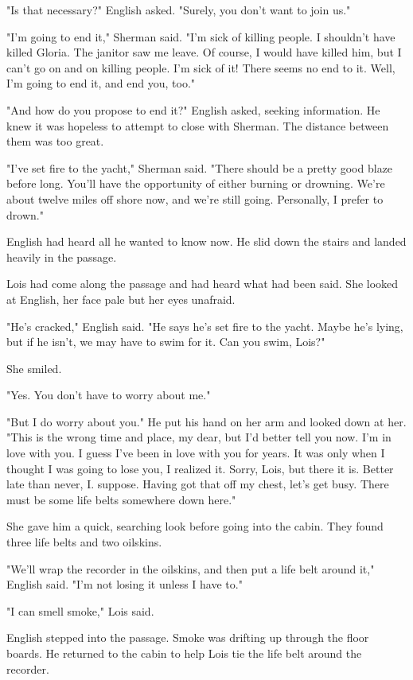 \documentclass{novel}
\begin{document}
"Is that necessary?" English asked. "Surely, you don't want to join us."

"I'm going to end it," Sherman said. "I'm sick of killing people. I shouldn't have killed Gloria. The janitor saw me leave. Of course, I would have killed him, but I can't go on and on killing people. I'm sick of it! There seems no end to it. Well, I'm going to end it, and end you, too."

"And how do you propose to end it?" English asked, seeking information. He knew it was hopeless to attempt to close with Sherman. The distance between them was too great.

"I've set fire to the yacht," Sherman said. "There should be a pretty good blaze before long. You'll have the opportunity of either burning or drowning. We're about twelve miles off shore now, and we're still going. Personally, I prefer to drown."

English had heard all he wanted to know now. He slid down the stairs and landed heavily in the passage.

Lois had come along the passage and had heard what had been said. She looked at English, her face pale but her eyes unafraid.

"He's cracked," English said. "He says he's set fire to the yacht. Maybe he's lying, but if he isn't, we may have to swim for it. Can you swim, Lois?"

She smiled.

"Yes. You don't have to worry about me."

"But I do worry about you." He put his hand on her arm and looked down at her. "This is the wrong time and place, my dear, but I'd better tell you now. I'm in love with you. I guess I've been in love with you for years. It was only when I thought I was going to lose you, I realized it. Sorry, Lois, but there it is. Better late than never, I. suppose. Having got that off my chest, let's get busy. There must be some life belts somewhere down here."

She gave him a quick, searching look before going into the cabin. They found three life belts and two oilskins.

"We'll wrap the recorder in the oilskins, and then put a life belt around it," English said. "I'm not losing it unless I have to."

"I can smell smoke," Lois said.

English stepped into the passage. Smoke was drifting up through the floor boards. He returned to the cabin to help Lois tie the life belt around the recorder.
\end{document}
